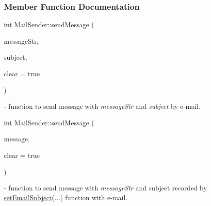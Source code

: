 \subsubsection{Member Function Documentation}
\mbox{\label{classMailSender_a57749e1c2f79dfe8d3c0dbb0e984f9b9}} 
{\footnotesize\ttfamily int Mail\+Sender\+::\texorpdfstring{send\+Message}{sendMessage}\hspace{0.1cm}{\footnotesize\ttfamily [1/2]} (\begin{DoxyParamCaption}\item[{Q\+String}]{message\+Str,  }\item[{Q\+String}]{subject,  }\item[{bool}]{clear = {\ttfamily true} }\end{DoxyParamCaption})} - function to send message with \textit{message\+Str} and \textit{subject} by e-mail. 

\mbox{\label{classMailSender_afcfdcae3a5ffb196d8357866a9d19020}} 
{\footnotesize\ttfamily int Mail\+Sender\+::\texorpdfstring{send\+Message}{sendMessage}\hspace{0.1cm}{\footnotesize\ttfamily [2/2]} (\begin{DoxyParamCaption}\item[{Q\+String}]{message,  }\item[{bool}]{clear = {\ttfamily true} }\end{DoxyParamCaption})} - function to send message with \textit{message\+Str} and  subject recorded by \mbox{\hyperlink{classMailSender_a9e5b40867b2bc78a71d4e91afabbefc6}{set\+Email\+Subject}}(...) function with e-mail. \\

